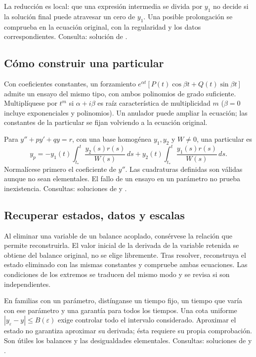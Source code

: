 La reducción es local: que una expresión intermedia se divida por
$y_1$ no decide si la solución final puede atravesar un cero de $y_1$.
Una posible prolongación se comprueba en la ecuación original, con la
regularidad y los datos correspondientes. Consulta: solución de
.

%
\subsection*{Cómo construir una particular}
\label{CH04-B04}
Con coeficientes constantes, un forzamiento
$e^{\alpha t}[P(t)\cos\beta t+Q(t)\sin\beta t]$ admite un ensayo del
mismo tipo, con ambos polinomios de grado suficiente. Multiplíquese por
$t^m$ si $\alpha+i\beta$ es raíz característica de multiplicidad $m$
($\beta=0$ incluye exponenciales y polinomios). Un anulador puede ampliar
la ecuación; las constantes de la particular se fijan volviendo a la
ecuación original.

Para $y''+p y'+q y=r$, con una base homogénea $y_1,y_2$ y $W\ne0$,
una particular es
\[
 y_p=-y_1(t)\int_{t_*}^{t}\frac{y_2(s)r(s)}{W(s)}\,ds
      +y_2(t)\int_{t_*}^{t}\frac{y_1(s)r(s)}{W(s)}\,ds.
\]
Normalícese primero el coeficiente de $y''$. Las cuadraturas definidas son
válidas aunque no sean elementales. El fallo de un ensayo en un parámetro
no prueba inexistencia. Consultas: soluciones de  y
.

%
\subsection*{Recuperar estados, datos y escalas}
\label{CH04-B05}
Al eliminar una variable de un balance acoplado, consérvese la relación
que permite reconstruirla. El valor inicial de la derivada de la variable
retenida se obtiene del balance original, no se elige libremente. Tras
resolver, reconstruya el estado eliminado con las mismas constantes y
compruebe ambas ecuaciones. Las condiciones de los extremos se traducen
del mismo modo y se revisa si son independientes.

En familias con un parámetro, distínganse un tiempo fijo, un tiempo que
varía con ese parámetro y una garantía para todos los tiempos.
Una cota uniforme $|y_\varepsilon-y|\le B(\varepsilon)$ exige controlar
todo el intervalo considerado. Aproximar el estado no garantiza aproximar
su derivada; ésta requiere su propia comprobación. Son útiles los balances
y las desigualdades elementales. Consultas: soluciones de
 y .
